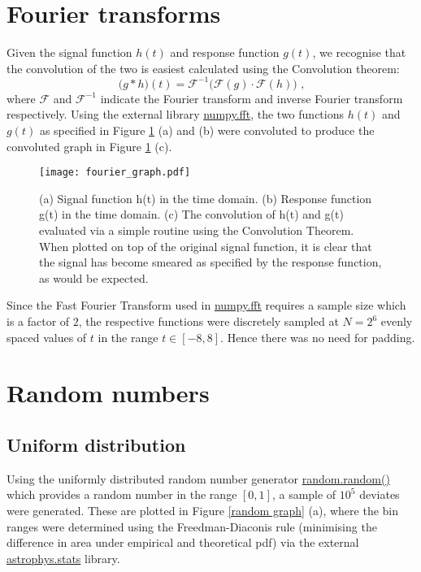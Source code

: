 \documentclass[paper=a4, fontsize=11pt]{scrartcl}
\begin{document}
\section{Fourier transforms}
Given the signal function $h(t)$ and response function $g(t)$, we recognise that the convolution of the two is easiest calculated using the Convolution theorem:
\begin{equation}
\big(g*h\big)(t) = \mathcal{F}^{-1} \Big( \mathcal{F} (g) \cdot \mathcal{F} (h) \Big) \text{ ,}
\end{equation}
where $\mathcal{F}$ and $\mathcal{F}^{-1}$ indicate the Fourier transform and inverse Fourier transform respectively. Using the external library \url{numpy.fft}, the two functions $h(t)$ and $g(t)$ as specified in Figure \ref{fourier graph} (a) and (b) were convoluted to produce the convoluted graph in Figure \ref{fourier graph} (c). 

\begin{figure}
	\centering
	\texttt{[image: fourier\_graph.pdf]}
	\caption{\footnotesize{(a) Signal function h(t) in the time domain. (b) Response function g(t) in the time domain. (c) The convolution of h(t) and g(t) evaluated via a simple routine using the Convolution Theorem. When plotted on top of the original signal function, it is clear that the signal has become smeared as specified by the response function, as would be expected.}}
	\label{fourier graph}
\end{figure}

Since the Fast Fourier Transform used in \url{numpy.fft} requires a sample size which is a factor of $2$, the respective functions were discretely sampled at $N=2^{6}$ evenly spaced values of $t$ in the range $t \in [-8,8]$. Hence there was no need for padding. 

\section{Random numbers}
\subsection{Uniform distribution}
Using the uniformly distributed random number generator \url{random.random()} which provides a random number in the range $[0,1]$, a sample of $10^{5}$ deviates were generated. These are plotted in Figure \ref{random graph} (a), where the bin ranges were determined using the Freedman-Diaconis rule (minimising the difference in area under empirical and theoretical pdf) via the external  \url{astrophys.stats} library. 
\end{document}
